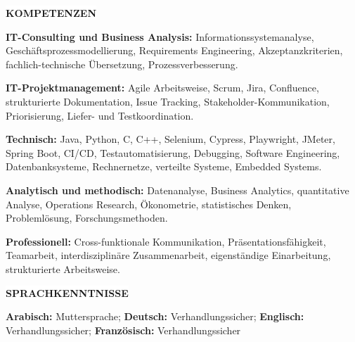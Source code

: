\documentclass[10pt,a4paper]{article}
\newcommand{\sectiontitle}[1]{%
  \vspace{6pt}%
  \noindent\hspace{1.1em}\colorbox{white}{\bfseries\MakeUppercase{#1}}\par
  \vspace{1pt}%
}
\newenvironment{cvsection}[1]{%
  \Needspace{5\baselineskip}%
  \sectiontitle{#1}%
  \begin{lrbox}{\cvsectionbox}%
    \begin{minipage}{\dimexpr\textwidth-2\fboxsep-2\fboxrule-4pt\relax}%
    \vspace{2pt}
}{%
    \vspace{2pt}
    \end{minipage}%
  \end{lrbox}%
  \noindent\fbox{\usebox{\cvsectionbox}}%
  \par
}
\begin{document}
\begin{cvsection}{Kompetenzen}
\textbf{IT-Consulting und Business Analysis:} Informationssystemanalyse, Geschäftsprozessmodellierung, Requirements Engineering, Akzeptanzkriterien, fachlich-technische Übersetzung, Prozessverbesserung.

\vspace{2pt}
\textbf{IT-Projektmanagement:} Agile Arbeitsweise, Scrum, Jira, Confluence, strukturierte Dokumentation, Issue Tracking, Stakeholder-Kommunikation, Priorisierung, Liefer- und Testkoordination.

\vspace{2pt}
\textbf{Technisch:} Java, Python, C, C++, Selenium, Cypress, Playwright, JMeter, Spring Boot, CI/CD, Testautomatisierung, Debugging, Software Engineering, Datenbanksysteme, Rechnernetze, verteilte Systeme, Embedded Systems.

\vspace{2pt}
\textbf{Analytisch und methodisch:} Datenanalyse, Business Analytics, quantitative Analyse, Operations Research, Ökonometrie, statistisches Denken, Problemlösung, Forschungsmethoden.

\vspace{2pt}
\textbf{Professionell:} Cross-funktionale Kommunikation, Präsentationsfähigkeit, Teamarbeit, interdisziplinäre Zusammenarbeit, eigenständige Einarbeitung, strukturierte Arbeitsweise.
\end{cvsection}

\begin{cvsection}{Sprachkenntnisse}
\textbf{Arabisch:} Muttersprache; \textbf{Deutsch:} Verhandlungssicher; \textbf{Englisch:} Verhandlungssicher; \textbf{Französisch:} Verhandlungssicher
\end{cvsection}
\end{document}

